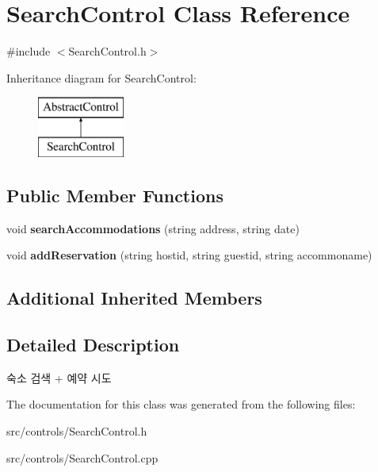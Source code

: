\hypertarget{class_search_control}{}\section{Search\+Control Class Reference}
\label{class_search_control}


{\ttfamily \#include $<$Search\+Control.\+h$>$}

Inheritance diagram for Search\+Control\+:\begin{figure}[H]
\begin{center}
\leavevmode
\includegraphics[height=2.000000cm]{class_search_control}
\end{center}
\end{figure}
\subsection*{Public Member Functions}
\begin{DoxyCompactItemize}
\item 
\mbox{\label{class_search_control_a96712e21f990caabad392818bd3a17a7}} 
void {\bfseries search\+Accommodations} (string address, string date)
\item 
\mbox{\label{class_search_control_a754ae7a3d0b00057a559034750422faa}} 
void {\bfseries add\+Reservation} (string hostid, string guestid, string accommoname)
\end{DoxyCompactItemize}
\subsection*{Additional Inherited Members}


\subsection{Detailed Description}
숙소 검색 + 예약 시도 

The documentation for this class was generated from the following files\+:\begin{DoxyCompactItemize}
\item 
src/controls/Search\+Control.\+h\item 
src/controls/Search\+Control.\+cpp\end{DoxyCompactItemize}
